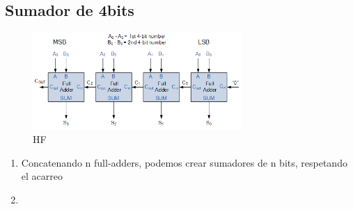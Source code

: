 \documentclass{article}
\begin{document}
        \subsection{Sumador de 4bits}
        \begin{figure}
            \includegraphics[width=300px]{sumador4bits.png}
            \caption{HF}
            \label{fig:Sumador 4bits}
        \end{figure}
        \begin{enumerate}
            \item Concatenando n full-adders, podemos crear sumadores de n bits, respetando el acarreo
            \item 
        \end{enumerate}
\end{document}
